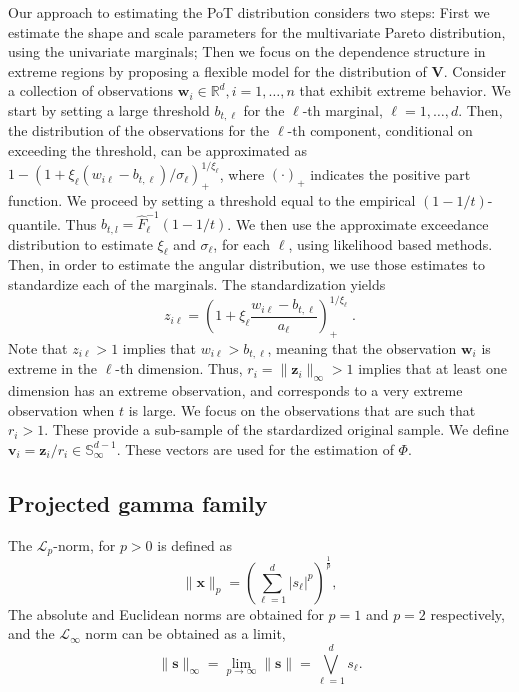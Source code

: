 \documentclass[iicol,sn-basic]{sn-jnl}
\theoremstyle{thmstyleone}
\begin{document}
Our approach to estimating the PoT distribution considers two steps: First we estimate the shape and scale parameters for the multivariate Pareto distribution, using the univariate marginals; Then we focus on the dependence structure in extreme regions by proposing a flexible model for the distribution of $\bm{V}$. Consider a collection of observations  $\bm{w}_i \in {\mathbb R}^d, i = 1, \ldots, n$ that exhibit extreme behavior.  We start by setting a large threshold $b_{t,\ell}$ for the  $\ell$-th marginal, $\ell = 1, \ldots,d$. Then, the distribution of the observations for the $\ell$-th component, conditional on exceeding the threshold, can be approximated as $1 - (1 + \xi_\ell   (w_{i\ell} - b_{t,\ell})/\sigma_\ell)_+^{1/\xi_\ell}$, where $(\cdot)_+$ indicates the positive part function.  We proceed by setting a threshold equal to the empirical $(1-1/t)$-quantile. Thus $b_{t,l}  = \hat{F}^{-1}_{\ell}(1 - 1/t)$.  We then use the approximate exceedance distribution to estimate $\xi_\ell$ and $\sigma_\ell$, for each $\ell$, using likelihood based methods. Then, in order to estimate the angular distribution, we use those estimates to standardize each of the marginals. The standardization yields
\begin{equation}
\label{eqn:standardization}
z_{i\ell} = \left(1 + \xi_{\ell}\frac{w_{i\ell} - b_{t,\ell}}{a_{\ell}}\right)_{+}^{1/\xi_{\ell}}\; .
\end{equation}
Note that $z_{i\ell}> 1$ implies that $w_{i\ell} > b_{t,\ell}$, meaning that the observation $\bm{w}_i$ is extreme in the $\ell$-th dimension. Thus, $r_i = \|\bm{z}_i\|_\infty > 1$ implies that at least one dimension has an extreme observation, and corresponds to a very extreme observation when $t$ is large. We focus on  the observations that are such that $r_i > 1$. These provide a sub-sample of the stardardized original sample. We define $\bm{v}_i = \bm{z}_i /r_i \in  \mathbb{S}_{\infty}^{d-1}$. These vectors are used for  the estimation of $\Phi$.

\subsection{Projected gamma family\label{subsec:projgamma}}
The $\mathcal{L}_p$-norm, for $p>0$ is  defined as
\begin{equation*}
\lVert \bm{x} \rVert_p =
\left({\textstyle\sum}_{\ell = 1}^d \lvert s_{\ell}\rvert^p\right)^{\frac{1}{p}},
\end{equation*}
The absolute and Euclidean norms are obtained for $p=1$ and $p=2$ respectively, and the $\mathcal{L}_{\infty}$ norm can be obtained as a limit,
\begin{equation*}
\| \bm{s} \|_{\infty}
= \lim\limits_{p\to\infty} \| \bm{s} \|
= \underset{\ell = 1}{\overset{d}{\bigvee}}s_{\ell}.
\end{equation*}
\end{document}
